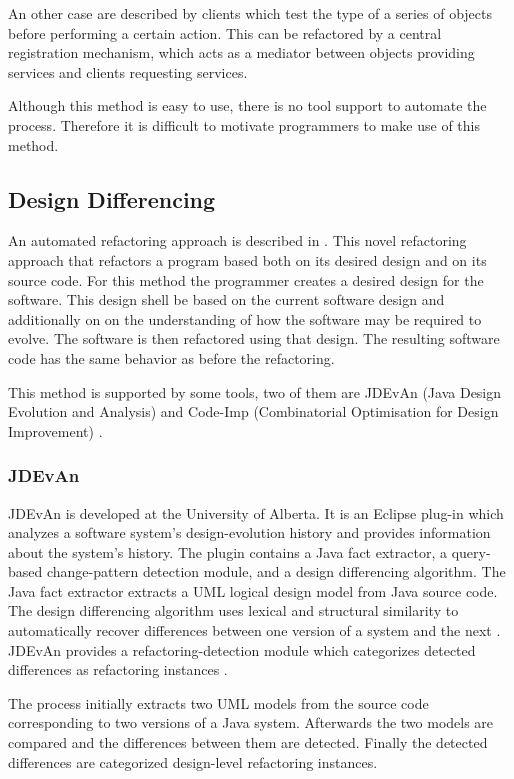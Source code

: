 \documentclass[conference,compsoc,a4paper]{IEEEtran}
\begin{document}
An other case are described by clients which test the type of a series of objects before performing a certain action. This can be refactored by a central registration mechanism, which acts as a mediator between objects providing services and clients requesting services.

Although this method is easy to use, there is no tool support to automate the process. Therefore it is difficult to motivate programmers to make use of this method. 

\subsection{Design Differencing}

An automated refactoring approach is described in \cite{design-diff}. This novel refactoring approach that refactors a program based both on its desired design and on	its source code.
For this method the programmer creates a desired design for the software. This design shell be based on the current software design and additionally on on the understanding of how the software may be required to evolve. The software is then refactored using that design. The resulting software code has the same behavior as before the refactoring.

This method is supported by some tools, two of them are JDEvAn (Java Design Evolution and Analysis) \cite{JDEvAn} and Code-Imp (Combinatorial Optimisation for Design Improvement) \cite{2008502} \cite{5313}.

\subsubsection{JDEvAn}
JDEvAn is developed at the University of Alberta. It is an Eclipse plug-in which analyzes a software system’s design-evolution history and provides information about the system’s history. The plugin contains a Java fact extractor, a query-based change-pattern detection module, and a design differencing algorithm. The Java fact extractor extracts a UML logical design model from Java source code. The design differencing algorithm uses lexical and structural similarity to automatically recover differences between one version of a system and the next \cite{Xing2007}.
JDEvAn provides a refactoring-detection module which categorizes detected differences as refactoring instances \cite{Xing:2006:RDB:1174510.1174736}.

The process initially extracts two UML models from the source code corresponding to two versions of a Java system. Afterwards the two models are compared and the differences between them are detected. Finally the detected differences are categorized	design-level refactoring instances.
\end{document}
